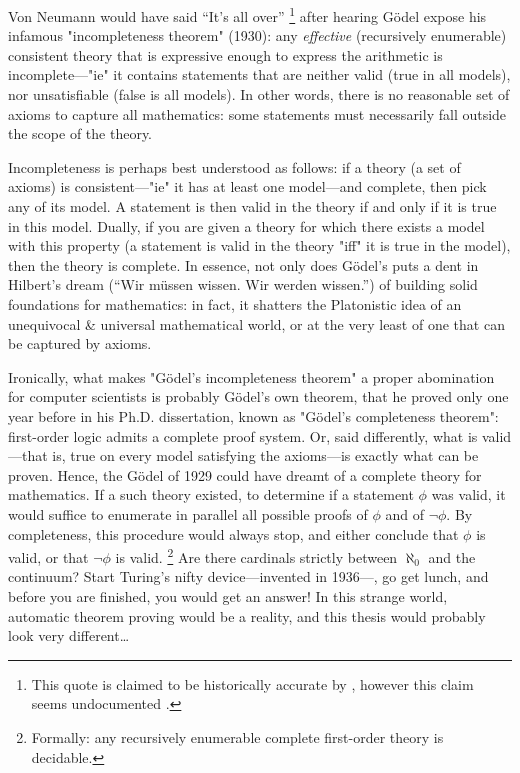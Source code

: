 Von Neumann would have said ``It's all over''%
\footnote{This quote is claimed to be historically accurate by
\cite{2009Logicomix}, however this claim seems undocumented \cite{Mancosu2011Logicomix}.}
after hearing Gödel expose his infamous "incompleteness theorem" (1930):
any \emph{effective} (recursively enumerable)
consistent theory that is expressive enough to express the arithmetic
is incomplete---"ie" it contains statements that are neither valid (true in all models),
nor unsatisfiable (false is all models).
In other words, there is no reasonable set of axioms
to capture all mathematics: some statements must necessarily fall outside
the scope of the theory.

Incompleteness is perhaps best understood as follows:
if a theory (a set of axioms) is consistent---"ie" it has at least one model---and complete, 
then pick any of its model. A statement is then valid in the theory if and only
if it is true in this model. Dually, if you are given a theory for which
there exists a model with this property (a statement is valid in the theory "iff" it
is true in the model), then the theory is complete.
In essence, not only does Gödel's puts a dent in Hilbert's dream
(``Wir müssen wissen. Wir werden wissen.'') of building solid foundations for mathematics:
in fact, it shatters the Platonistic idea of an unequivocal \& universal mathematical world, or 
at the very least of one that can be captured by axioms.

Ironically, what makes "Gödel's incompleteness theorem" a proper
abomination  for computer scientists is probably Gödel's own theorem, that he proved only one year before in his
Ph.D. dissertation, known as "Gödel's completeness theorem": 
first-order logic admits a complete proof system. Or, said differently,
what is valid---that is, true on every model satisfying the axioms---is exactly what
can be proven. 
Hence, the Gödel of 1929 could have dreamt of a complete theory for mathematics.
If a such theory existed, to determine if a statement $\phi$ was valid, it would suffice
to enumerate in parallel all possible proofs of $\phi$ and of $\neg \phi$. By completeness, this 
procedure would always stop, and either conclude that $\phi$ is valid, or that
$\neg \phi$ is valid.%
\footnote{Formally: any recursively enumerable complete first-order theory is decidable.}
Are there cardinals strictly between $\aleph_0$ and the continuum?
Start Turing's nifty device---invented in 1936---, go get lunch, and before you are finished,
you would get an answer! In this strange world, automatic theorem proving would be a reality,
and this thesis would probably look very different…

